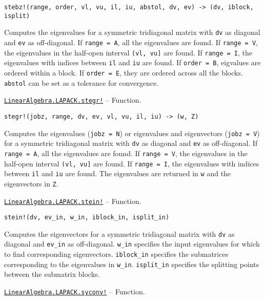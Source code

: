 \begin{adjustwidth}{2em}{0pt}


\begin{verbatim}
stebz!(range, order, vl, vu, il, iu, abstol, dv, ev) -> (dv, iblock, isplit)
\end{verbatim}

Computes the eigenvalues for a symmetric tridiagonal matrix with \texttt{dv} as diagonal and \texttt{ev} as off-diagonal. If \texttt{range = A}, all the eigenvalues are found. If \texttt{range = V}, the eigenvalues in the half-open interval \texttt{(vl, vu]} are found. If \texttt{range = I}, the eigenvalues with indices between \texttt{il} and \texttt{iu} are found. If \texttt{order = B}, eigvalues are ordered within a block. If \texttt{order = E}, they are ordered across all the blocks. \texttt{abstol} can be set as a tolerance for convergence.



\end{adjustwidth}
\hypertarget{18007684687736525555}{} 
\hyperlink{18007684687736525555}{\texttt{LinearAlgebra.LAPACK.stegr!}}  -- {Function.}

\begin{adjustwidth}{2em}{0pt}


\begin{verbatim}
stegr!(jobz, range, dv, ev, vl, vu, il, iu) -> (w, Z)
\end{verbatim}

Computes the eigenvalues (\texttt{jobz = N}) or eigenvalues and eigenvectors (\texttt{jobz = V}) for a symmetric tridiagonal matrix with \texttt{dv} as diagonal and \texttt{ev} as off-diagonal. If \texttt{range = A}, all the eigenvalues are found. If \texttt{range = V}, the eigenvalues in the half-open interval \texttt{(vl, vu]} are found. If \texttt{range = I}, the eigenvalues with indices between \texttt{il} and \texttt{iu} are found. The eigenvalues are returned in \texttt{w} and the eigenvectors in \texttt{Z}.



\end{adjustwidth}
\hypertarget{4475992932708638755}{} 
\hyperlink{4475992932708638755}{\texttt{LinearAlgebra.LAPACK.stein!}}  -- {Function.}

\begin{adjustwidth}{2em}{0pt}


\begin{verbatim}
stein!(dv, ev_in, w_in, iblock_in, isplit_in)
\end{verbatim}

Computes the eigenvectors for a symmetric tridiagonal matrix with \texttt{dv} as diagonal and \texttt{ev\_in} as off-diagonal. \texttt{w\_in} specifies the input eigenvalues for which to find corresponding eigenvectors. \texttt{iblock\_in} specifies the submatrices corresponding to the eigenvalues in \texttt{w\_in}. \texttt{isplit\_in} specifies the splitting points between the submatrix blocks.



\end{adjustwidth}
\hypertarget{7330295151672323275}{} 
\hyperlink{7330295151672323275}{\texttt{LinearAlgebra.LAPACK.syconv!}}  -- {Function.}

